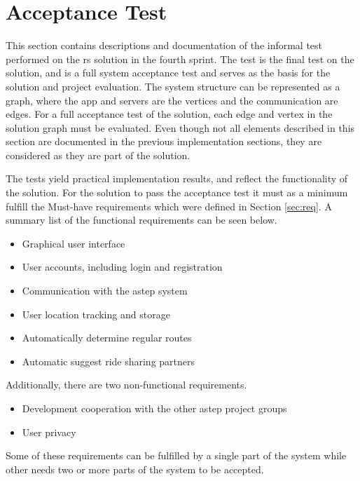 \iffalse
\section{Acceptance Test}
This section contains descriptions and documentation of the informal test performed on the \gls{rs} solution in the fourth sprint.
The test is the final test on the solution, and is a full system acceptance test and serves as the basis for the solution and project evaluation.
The system structure can be represented as a graph, where the app and servers are the vertices and the communication are edges. 
For a full acceptance test of the solution, each edge and vertex in the solution graph must be evaluated. 
Even though not all elements described in this section are documented in the previous implementation sections, they are considered as they are part of the solution.

The tests yield practical implementation results, and reflect the functionality of the solution.
For the solution to pass the acceptance test it must as a minimum fulfill the Must-have requirements which were defined in Section \ref{sec:req}.
A summary list of the functional requirements can be seen below.
\begin{itemize}
	\item Graphical user interface
	\item User accounts, including login and registration
	\item Communication with the \gls{astep} system
	\item User location tracking and storage
	\item Automatically determine regular routes
	\item Automatic suggest ride sharing partners
\end{itemize}

Additionally, there are two non-functional requirements.
\begin{itemize}
	\item Development cooperation with the other \gls{astep} project groups
	\item User privacy
\end{itemize}

Some of these requirements can be fulfilled by a single part of the system while other needs two or more parts of the system to be accepted.


